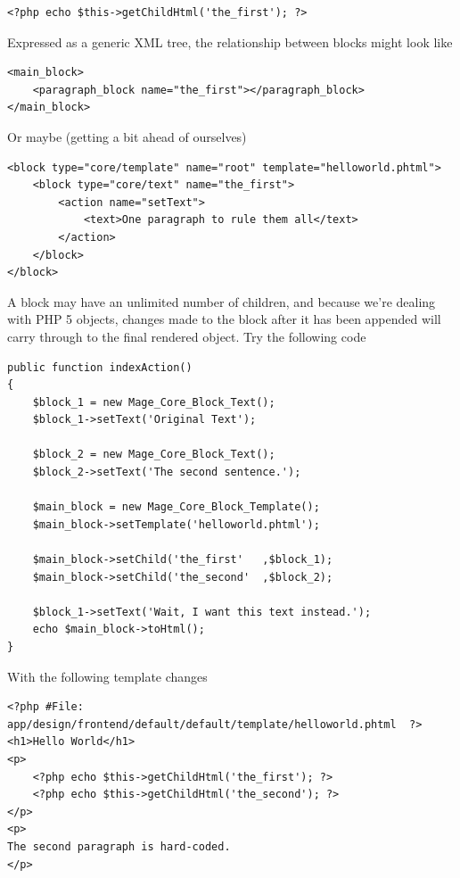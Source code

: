 \documentclass[oneside]{book}
\begin{document}
\begin{lstlisting}
<?php echo $this->getChildHtml('the_first'); ?>

\end{lstlisting}


Expressed as a generic XML tree, the relationship between blocks might look like

\begin{lstlisting}
<main_block>
    <paragraph_block name="the_first"></paragraph_block>
</main_block>

\end{lstlisting}


Or maybe (getting a bit ahead of ourselves)

\begin{lstlisting}
<block type="core/template" name="root" template="helloworld.phtml">
    <block type="core/text" name="the_first">
        <action name="setText">
            <text>One paragraph to rule them all</text>
        </action>
    </block>
</block>

\end{lstlisting}


A block may have an unlimited number of children, and because we're dealing with PHP 5 objects, changes made to the block after it has been appended will carry through to the final rendered object.  Try the following code

\begin{lstlisting}
public function indexAction()
{
    $block_1 = new Mage_Core_Block_Text();
    $block_1->setText('Original Text');

    $block_2 = new Mage_Core_Block_Text();
    $block_2->setText('The second sentence.');

    $main_block = new Mage_Core_Block_Template();
    $main_block->setTemplate('helloworld.phtml');

    $main_block->setChild('the_first'   ,$block_1);
    $main_block->setChild('the_second'  ,$block_2);

    $block_1->setText('Wait, I want this text instead.');
    echo $main_block->toHtml();
}

\end{lstlisting}


With the following template changes

\begin{lstlisting}
<?php #File: app/design/frontend/default/default/template/helloworld.phtml  ?>
<h1>Hello World</h1>
<p>
    <?php echo $this->getChildHtml('the_first'); ?>
    <?php echo $this->getChildHtml('the_second'); ?>
</p>
<p>
The second paragraph is hard-coded.
</p>

\end{lstlisting}
\end{document}
